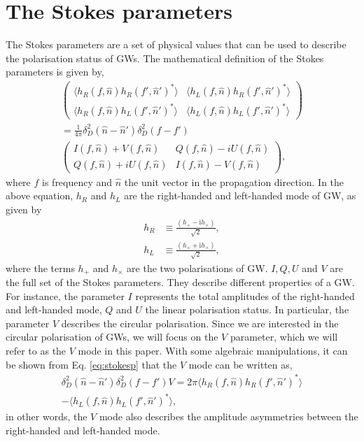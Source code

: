\documentclass[aps,twocolumn,showpacs,groupedaddress, nofootinbib]{revtex4}  %
\begin{document}
\section{The Stokes parameters}\label{sec:stokes}
The Stokes parameters \cite{seto2007measuring} are a set of physical values that can be used to describe the polarisation status of \acp{GW}. 
The mathematical definition of the Stokes parameters is given by,
\begin{align}\label{eq:stokesp}
\begin{pmatrix}
 \langle h_R(f, \hat{n}) h_R(f', \hat{n}')^{*}\rangle & \langle h_L(f, \hat{n}) h_R(f', \hat{n}')^{*}\rangle\\ \nonumber
\langle h_R(f, \hat{n}) h_L(f', \hat{n}')^{*}\rangle & \langle h_L(f, \hat{n}) h_L(f', \hat{n}')^{*}\rangle
\end{pmatrix}
\\
= \frac{1}{4\pi}\delta_{D}^2(\hat{n} - \hat{n}')\delta_{D}^2(f - f')\nonumber \\ 
\begin{pmatrix}
 I(f, \hat{n}) + V(f, \hat{n}) & Q(f, \hat{n}) - iU(f, \hat{n})\\
 Q(f, \hat{n}) + iU(f, \hat{n}) & I(f, \hat{n}) - V(f, \hat{n})
\end{pmatrix},
\end{align}
where $f$ is frequency and $\hat{n}$ the unit vector in the propagation direction.
In the above equation, $h_R$ and $h_L$ are  the right-handed and left-handed mode of \ac{GW}, as given by
\begin{align}\label{eq:rhlh}
 h_R &\equiv \frac{(h_{+} - \text{i}h_{\times})}{\sqrt{2}},\nonumber \\
 h_L &\equiv \frac{(h_{+} + \text{i}h_{\times})}{\sqrt{2}},
\end{align}
where the terms $h_{+}$ and $h_{\times}$ are the two polarisations of \ac{GW}.
$I, Q, U$ and $V$ are the full set of the Stokes parameters.
They describe different properties of a \ac{GW}. 
For instance, the parameter $I$ represents the total amplitudes of the right-handed and left-handed mode,
$Q$ and $U$ the linear polarisation status. 
In particular, the parameter $V$  describes the circular polarisation.
Since we are interested in the circular polarisation of \acp{GW}, 
we will focus on the $V$ parameter, which we will refer to as the $V$ mode in this paper.
With some algebraic manipulations, it can be shown from Eq. \ref{eq:stokesp} that the $V$ mode can be written as,
\begin{align}\label{eq:stokesV}
 \delta_{D}^2(\hat{n} - \hat{n}')\delta_{D}^2(f - f')V = 2\pi \langle h_R(f, \hat{n}) h_R(f', \hat{n}')^{*}\rangle  \nonumber \\
 -  \langle h_L(f, \hat{n}) h_L(f', \hat{n}')^{*}\rangle,
\end{align}
in other words, the $V$ mode also describes the amplitude asymmetries between the right-handed and left-handed mode.
\end{document}
